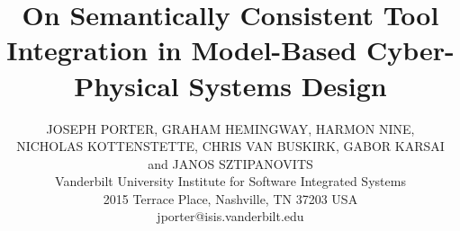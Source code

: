 \title{On Semantically Consistent Tool Integration in 
Model-Based Cyber-Physical Systems Design}

\author{JOSEPH PORTER, GRAHAM HEMINGWAY, HARMON NINE, \\ NICHOLAS KOTTENSTETTE, CHRIS VAN BUSKIRK, 
GABOR KARSAI \\ and JANOS SZTIPANOVITS \\
Vanderbilt University Institute for Software Integrated Systems \\ 2015
Terrace Place, Nashville, TN 37203 USA\\ 
jporter@isis.vanderbilt.edu
}

